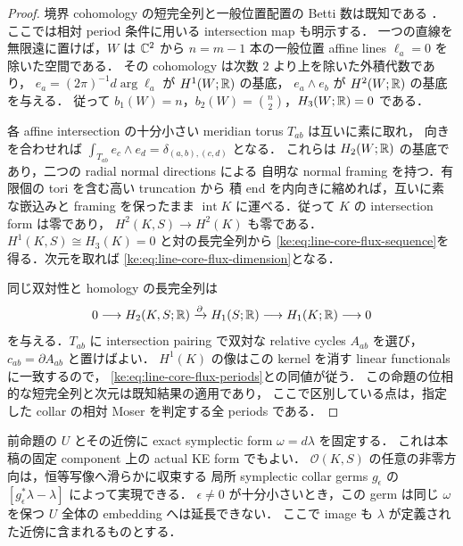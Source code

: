 \begin{proof}
境界 cohomology の短完全列と一般位置配置の Betti 数は既知である
\cite[Proposition~2.5, Corollary~2.6 and \S6.9]{CohenSuciuBoundary}．
ここでは相対 period 条件に用いる intersection map も明示する．
一つの直線を無限遠に置けば，$W$ は $\mathbb C^2$ から
$n=m-1$ 本の一般位置 affine lines $\ell_a=0$ を除いた空間である．
その cohomology は次数 $2$ より上を除いた外積代数であり，
$e_a=(2\pi)^{-1}d\arg\ell_a$ が $H^1(W;\mathbb R)$ の基底，
$e_a\wedge e_b$ が $H^2(W;\mathbb R)$ の基底を与える．
従って $b_1(W)=n$，$b_2(W)=\binom n2$，$H_3(W;\mathbb R)=0$ である．

各 affine intersection の十分小さい meridian torus $T_{ab}$ は互いに素に取れ，
向きを合わせれば $\int_{T_{ab}}e_c\wedge e_d=\delta_{(a,b),(c,d)}$ となる．
これらは $H_2(W;\mathbb R)$ の基底であり，二つの radial normal directions による
自明な normal framing を持つ．有限個の tori を含む高い truncation から
積 end を内向きに縮めれば，互いに素な嵌込みと framing を保ったまま
$\operatorname{int}K$ に運べる．従って $K$ の intersection form は零であり，
$H^2(K,S)\to H^2(K)$ も零である．
$H^1(K,S)\cong H_3(K)=0$ と対の長完全列から
\eqref{ke:eq:line-core-flux-sequence}を得る．次元を取れば
\eqref{ke:eq:line-core-flux-dimension}となる．

同じ双対性と homology の長完全列は
\[
 0\longrightarrow H_2(K,S;\mathbb R)\xrightarrow{\partial}H_1(S;\mathbb R)
 \longrightarrow H_1(K;\mathbb R)\longrightarrow0
\]
を与える．$T_{ab}$ に intersection pairing で双対な relative cycles
$A_{ab}$ を選び，$c_{ab}=\partial A_{ab}$ と置けばよい．
$H^1(K)$ の像はこの kernel を消す linear functionals に一致するので，
\eqref{ke:eq:line-core-flux-periods}との同値が従う．
この命題の位相的な短完全列と次元は既知結果の適用であり，
ここで区別している点は，指定した collar の相対 Moser を判定する全 periods である．
\end{proof}

\begin{corollary}
\label{ke:nonextendible-small-core-germ}
前命題の $U$ とその近傍に exact symplectic form $\omega=d\lambda$ を固定する．
これは本稿の固定 component 上の actual KE form でもよい．
$\mathcal O(K,S)$ の任意の非零方向は，恒等写像へ滑らかに収束する
局所 symplectic collar germs $g_\epsilon$ の
$[g_\epsilon^*\lambda-\lambda]$ によって実現できる．
$\epsilon\ne0$ が十分小さいとき，この germ は同じ $\omega$ を保つ
$U$ 全体の embedding へは延長できない．
ここで image も $\lambda$ が定義された近傍に含まれるものとする．
\end{corollary}

